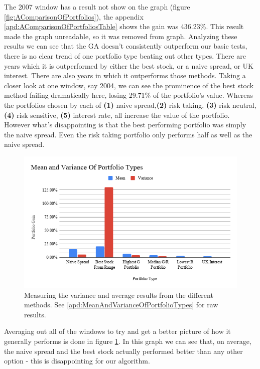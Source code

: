 \documentclass[11pt]{article}
\begin{document}
    The 2007 window has a result not show on the graph (figure \ref{fig:AComparisonOfPortfolios}), the appendix \ref{apd:AComparisonOfPortfoliosTable}
    shows the gain was 436.23\%. This result made the graph unreadable, so it was removed from graph. Analyzing
    these results we can see that the GA doesn't consistently outperform our basic
    tests, there is no clear trend of one portfolio type beating out other types. There are years which it is outperformed by either the best stock, or a naive
    spread, or UK interest. There are also years in which it outperforms those methods.
    Taking a closer
    look at one window, say 2004, we can see the prominence of the best stock method
    failing dramatically here, losing 29.71\% of the portfolio's value. Whereas
    the portfolios chosen by each of \textbf{(1)} naive spread,\textbf{(2)} risk taking, \textbf{(3)} risk neutral, \textbf{(4)} risk
    sensitive, \textbf{(5)} interest rate, all increase the value of the portfolio. However
    what's disappointing is that the best performing portfolio was simply the naive spread.
    Even the risk taking portfolio only performs half as well as the naive spread.

    \begin{figure}[H] %
        \includegraphics[width=\textwidth]{MeanAndVarianceOfPortfolioTypes}
        \caption{Measuring the variance and average results from the different methods. See \ref{apd:MeanAndVarianceOfPortfolioTypes} for raw results.}\label{fig:MeanAndVarianceOfPortfolioTypes}
    \end{figure}

    Averaging out all of the windows to try and get a better picture of how it generally
    performs is done in figure \ref{fig:MeanAndVarianceOfPortfolioTypes}. In this graph
    we can see that, on average, the naive spread and the best stock actually performed
    better than any other option - this is disappointing for our algorithm.
\end{document}
